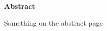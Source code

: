 \documentclass[../main.tex]{subfiles} %
\begin{document}
\clearpage %

\begin{center} %
    \textbf{\textsf{Abstract}} %
\end{center}
\vspace{1em} %

Something on the abstract page
\end{document}
